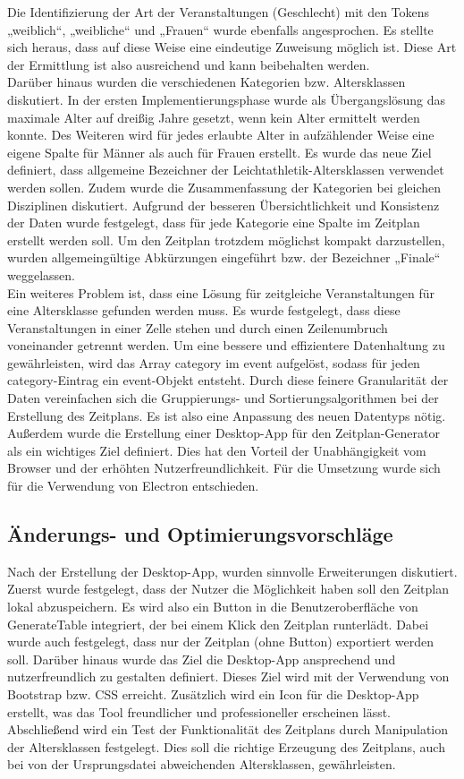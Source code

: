 Die Identifizierung der Art der Veranstaltungen (Geschlecht) mit den Tokens „weiblich“, „weibliche“ und „Frauen“ wurde ebenfalls angesprochen. Es stellte sich heraus, dass auf diese Weise eine eindeutige Zuweisung möglich ist. Diese Art der Ermittlung ist also ausreichend und kann beibehalten werden.\\
Darüber hinaus wurden die verschiedenen Kategorien bzw. Altersklassen diskutiert. In der ersten Implementierungsphase wurde als Übergangslösung das maximale Alter auf dreißig Jahre gesetzt, wenn kein Alter ermittelt werden konnte. Des Weiteren wird für jedes erlaubte Alter in aufzählender Weise eine eigene Spalte für Männer als auch für Frauen erstellt. Es wurde das neue Ziel definiert, dass allgemeine Bezeichner der Leichtathletik-Altersklassen verwendet werden sollen. Zudem wurde die Zusammenfassung der Kategorien bei gleichen Disziplinen diskutiert. Aufgrund der besseren Übersichtlichkeit und Konsistenz der Daten wurde festgelegt, dass für jede Kategorie eine Spalte im Zeitplan erstellt werden soll. Um den Zeitplan trotzdem möglichst kompakt darzustellen, wurden allgemeingültige Abkürzungen eingeführt bzw. der Bezeichner „Finale“ weggelassen. \\
Ein weiteres Problem ist, dass eine Lösung für zeitgleiche Veranstaltungen für eine Altersklasse gefunden werden muss. Es wurde festgelegt, dass diese Veranstaltungen in einer Zelle stehen und durch einen Zeilenumbruch voneinander getrennt werden. Um eine bessere und effizientere Datenhaltung zu gewährleisten, wird das Array category im event aufgelöst, sodass für jeden category-Eintrag ein event-Objekt entsteht. Durch diese feinere Granularität der Daten vereinfachen sich die Gruppierungs- und Sortierungsalgorithmen bei der Erstellung des Zeitplans. Es ist also eine Anpassung des neuen Datentyps nötig.\\
Außerdem wurde die Erstellung einer Desktop-App für den Zeitplan-Generator als ein wichtiges Ziel definiert. Dies hat den Vorteil der Unabhängigkeit vom Browser und der erhöhten Nutzerfreundlichkeit. Für die Umsetzung wurde sich für die Verwendung von Electron entschieden.

\subsection{Änderungs- und Optimierungsvorschläge}
Nach der Erstellung der Desktop-App, wurden sinnvolle Erweiterungen diskutiert. Zuerst wurde festgelegt, dass der Nutzer die Möglichkeit haben soll den Zeitplan lokal abzuspeichern. Es wird also ein Button in die Benutzeroberfläche von GenerateTable integriert, der bei einem Klick den Zeitplan runterlädt. Dabei wurde auch festgelegt, dass nur der Zeitplan (ohne Button) exportiert werden soll.
Darüber hinaus wurde das Ziel die Desktop-App ansprechend und nutzerfreundlich zu gestalten definiert. Dieses Ziel wird mit der Verwendung von Bootstrap bzw. CSS erreicht. Zusätzlich wird ein Icon für die Desktop-App erstellt, was das Tool freundlicher und professioneller erscheinen lässt.
Abschließend wird ein Test der Funktionalität des Zeitplans durch Manipulation der Altersklassen festgelegt. Dies soll die richtige Erzeugung des Zeitplans, auch bei von der Ursprungsdatei abweichenden Altersklassen, gewährleisten.

